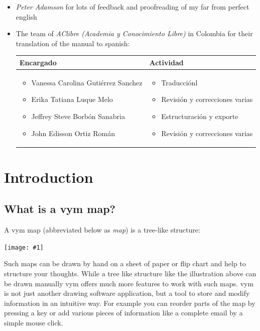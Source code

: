 \documentclass[12pt,a4paper]{article}
\newcommand{\maximage}[1]{  
    \begin{center}
        \texttt{[image: \#1]} 
    \end{center}
}
\newcommand{\vym}{{\sc vym }}
\begin{document}
\begin{itemize}
    \item {\em Peter Adamson} for lots of feedback and proofreading of my
          far from perfect english
    \item The team of {\em AClibre (Academia y Conocimiento Libre)}
          in Colombia for their translation of
          the manual to spanish:
          \begin{center}
            \begin{tabular}{|p{7cm}|p{5.5cm}|} \hline
                Encargado & Actividad \\ \hline
                \begin{itemize}
                   \item Vanessa Carolina Guti\'errez Sanchez
                   \item Erika Tatiana Luque Melo
                   \item Jeffrey Steve Borb\'on Sanabria
                   \item John Edisson Ortiz Rom\'an
                \end{itemize} &
                \begin{itemize}
                    \item Traducci\'onl
                    \item Revisi\'on y correcciones varias
                    \item Estructuraci\'on y exporte
                    \item Revisi\'on y correcciones varias
                \end{itemize}     \\ \hline
            \end{tabular}   
        \end{center}
\end{itemize}
\newpage


\section{Introduction}
\subsection{What is a \vym map?}
A \vym map (abbreviated below as {\em map}) is a tree-like structure:
\maximage{images/example1.png}
Such maps can be drawn by hand on a sheet of paper or flip chart and help to
structure your thoughts. While a tree like structure like the illustration above can be
drawn manually \vym offers much more features to work with such maps.
\vym is not just another drawing software application, but a tool to store and modify
information in an intuitive way. For example you can reorder parts of
the map by pressing a key or add various pieces of information like a complete
email by a simple mouse click.
\end{document}
